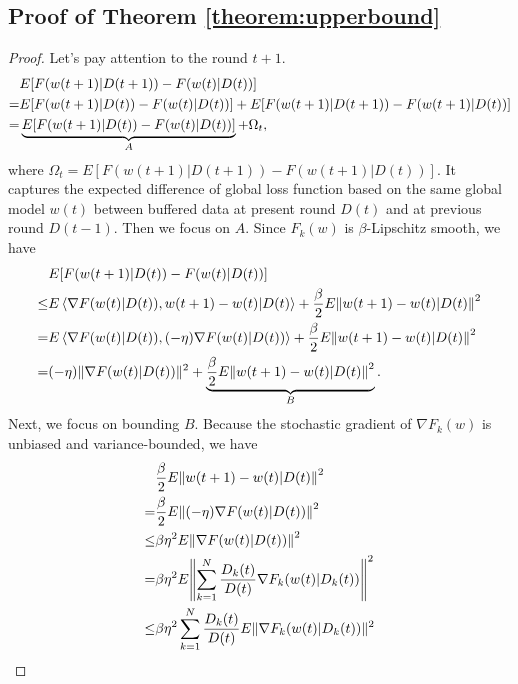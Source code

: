 \documentclass{article}
\theoremstyle{plain}
\theoremstyle{definition}
\theoremstyle{remark}
\begin{document}
\subsection{Proof of Theorem \ref{theorem:upperbound}}
\begin{proof}
  \label{proof:upperbound}
  Let's pay attention to the round $t+1$.
  \begin{align}
    \label{proof:init}
      & E[F(w(t+1)|D(t+1))-F(w(t)|D(t))] \notag \\
      = & E[F(w(t+1)|D(t))-F(w(t)|D(t))] + E[F(w(t+1)|D(t+1))-F(w(t+1)|D(t))] \notag \\
      = & \underbrace{E[F(w(t+1)|D(t))-F(w(t)|D(t))]}_A + \Omega_t,
  \end{align}
  where $\Omega_t = E[F(w(t+1)|D(t+1))-F(w(t+1)|D(t))]$. It captures the expected difference of global loss function based on the same global model $w(t)$ between buffered data at present round $D(t)$ and at previous round $D(t - 1)$. 
  Then we focus on $A$. Since $F_k(w)$ is $\beta$-Lipschitz smooth, we have
  \begin{align}
    \label{proof:boundA}
        & E[F(w(t+1)|D(t))-F(w(t)|D(t))] \notag \\
    \leq & E\left\langle \nabla F(w(t)|D(t)), w(t+1)-w(t)|D(t)\right\rangle + \frac{\beta}{2}E{\Vert w(t+1)-w(t)|D(t) \Vert}^2 \notag \\
    =    & E\left\langle \nabla F(w(t)|D(t)), (-\eta)\nabla F(w(t)|D(t))\right\rangle + \frac{\beta}{2}E{\Vert w(t+1)-w(t)|D(t) \Vert}^2 \notag \\ 
    =    & (-\eta) \Vert \nabla F(w(t)|D(t))\Vert^2 + \underbrace{\frac{\beta}{2}E{\Vert w(t+1)-w(t)|D(t) \Vert}^2}_{B}.
  \end{align}
  Next, we focus on bounding $B$. Because the stochastic gradient of $\nabla F_k(w)$ is unbiased and variance-bounded, we have 
  \begin{align}
    \label{proof:boundB}
         & \frac{\beta}{2} E {\Vert w(t+1) - w(t) | D(t) \Vert}^2 \notag \\
    =    & \frac{\beta}{2} E {\Vert (-\eta) \nabla F(w(t)|D(t))\Vert}^2 \notag \\
    \leq & \beta\eta^2 E{\Vert\nabla F(w(t)|D(t))\Vert}^2 \notag \\
    =    & \beta\eta^2 E{\left\Vert \sum_{k=1}^{N} \frac{D_k(t)}{D(t)} \nabla F_k(w(t)|D_k(t))\right\Vert}^2 \notag \\
    \leq & \beta\eta^2 \sum_{k=1}^{N} \frac{D_k(t)}{D(t)} E\Vert\nabla F_k(w(t)|D_k(t))\Vert^2 \notag \\

\end{align}
\end{proof}
\end{document}

